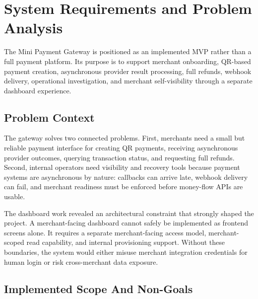 \chapter{System Requirements and Problem Analysis}

The Mini Payment Gateway is positioned as an implemented MVP rather than a full
payment platform. Its purpose is to support merchant onboarding, QR-based
payment creation, asynchronous provider result processing, full refunds,
webhook delivery, operational investigation, and merchant self-visibility
through a separate dashboard experience.

\section{Problem Context}

The gateway solves two connected problems. First, merchants need a small but
reliable payment interface for creating QR payments, receiving asynchronous
provider outcomes, querying transaction status, and requesting full refunds.
Second, internal operators need visibility and recovery tools because payment
systems are asynchronous by nature: callbacks can arrive late, webhook delivery
can fail, and merchant readiness must be enforced before money-flow APIs are
usable.

The dashboard work revealed an architectural constraint that strongly shaped the
project. A merchant-facing dashboard cannot safely be implemented as frontend
screens alone. It requires a separate merchant-facing access model, merchant-
scoped read capability, and internal provisioning support. Without these
boundaries, the system would either misuse merchant integration credentials for
human login or risk cross-merchant data exposure.

\section{Implemented Scope And Non-Goals}

